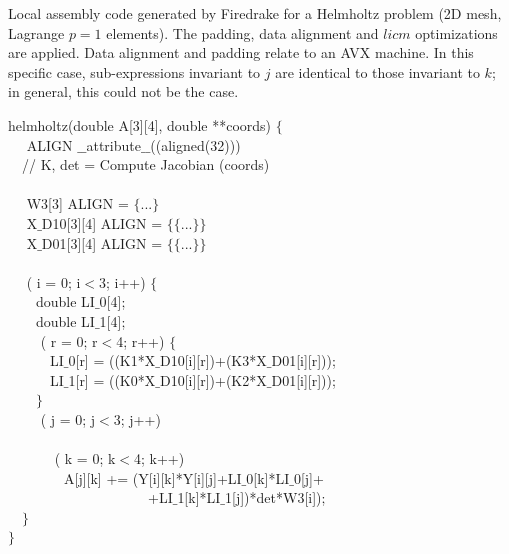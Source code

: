 \documentclass[conference]{IEEEtran}
\begin{document}
\begin{algorithm}[t]
\small
\caption{Local assembly code generated by Firedrake for a Helmholtz problem (2D mesh, Lagrange $p=1$ elements). The padding, data alignment and $licm$ optimizations are applied. Data alignment and padding relate to an AVX machine. In this specific case, sub-expressions invariant to $j$ are identical to those invariant to $k$; in general, this could not be the case.}
\label{code:helmholtz-licm}
 helmholtz(double A[3][4], double **coords) $\lbrace$\\
~~ ALIGN $\_\_$attribute$\_\_$((aligned(32))) \\
~~// K, det = Compute Jacobian (coords) \\
~~\\
~~ W3[3] ALIGN = $\lbrace$...$\rbrace$\\
~~ X$\_$D10[3][4] ALIGN = $\lbrace\lbrace$...$\rbrace\rbrace$\\
~~ X$\_$D01[3][4] ALIGN = $\lbrace\lbrace$...$\rbrace\rbrace$\\
~~\\
~~ ( i = 0; i$<$3; i++) $\lbrace$ \\
~~~~double LI$\_$0[4];\\
~~~~double LI$\_$1[4];\\
~~~~ ( r = 0; r$<$4; r++) $\lbrace$ \\
~~~~~~LI$\_$0[r] = ((K1*X$\_$D10[i][r])+(K3*X$\_$D01[i][r]));\\
~~~~~~LI$\_$1[r] = ((K0*X$\_$D10[i][r])+(K2*X$\_$D01[i][r]));\\
~~~~$\rbrace$\\
~~~~ ( j = 0; j$<$3; j++) \\
~~~~~~\\
~~~~~~ ( k = 0; k$<$4; k++) \\
~~~~~~~~A[j][k] += (Y[i][k]*Y[i][j]+LI$\_$0[k]*LI$\_$0[j]+\\
~~~~~~~~~~~~~~~~~~~~+LI$\_$1[k]*LI$\_$1[j])*det*W3[i]);\\
~~$\rbrace$\\
$\rbrace$
\end{algorithm}


\end{document}
